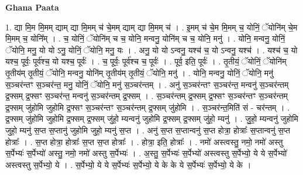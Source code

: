 \documentclass[17pt]{extarticle}
\begin{document}
\textbf{Ghana Paata } \newline

1. द्या मि॒म मि॒मम् द्याम् द्या मि॒मम् च॑ चे॒मम् द्याम् द्या मि॒मम् च॑ । . इ॒मम् च॑ चे॒म मि॒मम् च॒ योनिं॒ ॅयोनि॑म् चे॒म मि॒मम् च॒ योनि᳚म् । . च॒ योनिं॒ ॅयोनि॑म् च च॒ योनि॒ मन्वनु॒ योनि॑म् च च॒ योनि॒ मनु॑ । . योनि॒ मन्वनु॒ योनिं॒ ॅयोनि॒ मनु॒ यो यो ऽनु॒ योनिं॒ ॅयोनि॒ मनु॒ यः । . अनु॒ यो यो ऽन्वनु॒ यश्च॑ च॒ यो ऽन्वनु॒ यश्च॑ । . यश्च॑ च॒ यो यश्च॒ पूर्वः॒ पूर्व॑श्च॒ यो यश्च॒ पूर्वः॑ । . च॒ पूर्वः॒ पूर्व॑श्च च॒ पूर्वः॑ । . पूर्व॒ इति॒ पूर्वः॑ । . तृ॒तीयं॒ ॅयोनिं॒ ॅयोनि॑म् तृ॒तीय॑म् तृ॒तीयं॒ ॅयोनि॒ मन्वनु॒ योनि॑म् तृ॒तीय॑म् तृ॒तीयं॒ ॅयोनि॒ मनु॑ । . योनि॒ मन्वनु॒ योनिं॒ ॅयोनि॒ मनु॑ स॒ञ्चर॑न्तꣳ स॒ञ्चर॑न्त॒ मनु॒ योनिं॒ ॅयोनि॒ मनु॑ स॒ञ्चर॑न्तम् । . अनु॑ स॒ञ्चर॑न्तꣳ स॒ञ्चर॑न्त॒ मन्वनु॑ स॒ञ्चर॑न्तम् द्र॒फ्सम् द्र॒फ्सꣳ स॒ञ्चर॑न्त॒ मन्वनु॑ स॒ञ्चर॑न्तम् द्र॒फ्सम् । . स॒ञ्चर॑न्तम् द्र॒फ्सम् द्र॒फ्सꣳ स॒ञ्चर॑न्तꣳ स॒ञ्चर॑न्तम् द्र॒फ्सम् जु॑होमि जुहोमि द्र॒फ्सꣳ स॒ञ्चर॑न्तꣳ स॒ञ्चर॑न्तम् द्र॒फ्सम् जु॑होमि । . स॒ञ्चर॑न्त॒मिति॑ सं - चर॑न्तम् । . द्र॒फ्सम् जु॑होमि जुहोमि द्र॒फ्सम् द्र॒फ्सम् जु॑हो॒ म्यन्वनु॑ जुहोमि द्र॒फ्सम् द्र॒फ्सम् जु॑हो॒ म्यनु॑ । . जु॒हो॒ म्यन्वनु॑ जुहोमि जुहो॒ म्यनु॑ स॒प्त स॒प्तानु॑ जुहोमि जुहो॒ म्यनु॑ स॒प्त । . अनु॑ स॒प्त स॒प्तान्वनु॑ स॒प्त होत्रा॒ होत्राः᳚ स॒प्तान्वनु॑ स॒प्त होत्राः᳚ । . स॒प्त होत्रा॒ होत्राः᳚ स॒प्त स॒प्त होत्राः᳚ । . होत्रा॒ इति॒ होत्राः᳚ । . नमो॑ अस्त्वस्तु॒ नमो॒ नमो॑ अस्तु स॒र्पेभ्यः॑ स॒र्पेभ्यो॑ अस्तु॒ नमो॒ नमो॑ अस्तु स॒र्पेभ्यः॑ । . अ॒स्तु॒ स॒र्पेभ्यः॑ स॒र्पेभ्यो॑ अस्त्वस्तु स॒र्पेभ्यो॒ ये ये स॒र्पेभ्यो॑ अस्त्वस्तु स॒र्पेभ्यो॒ ये । . स॒र्पेभ्यो॒ ये ये स॒र्पेभ्यः॑ स॒र्पेभ्यो॒ ये के के ये स॒र्पेभ्यः॑ स॒र्पेभ्यो॒ ये के । \newline
\end{document}
